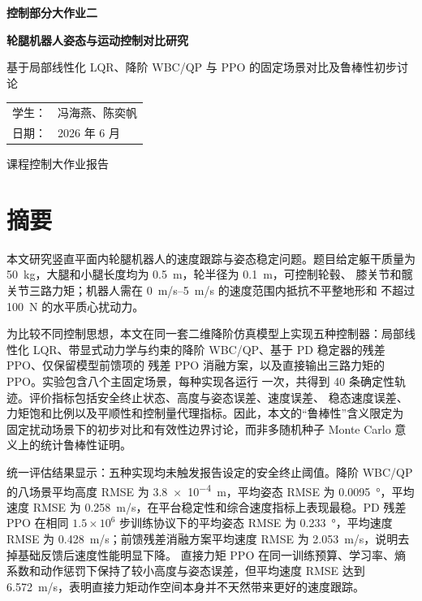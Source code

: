 \documentclass[UTF8,12pt,a4paper,fontset=none]{ctexart}
\begin{document}
\begin{titlepage}
  \centering
  \vspace*{2.0cm}
  {\bfseries 控制部分大作业二\par}
  \vspace{1.0cm}
  {\bfseries 轮腿机器人姿态与运动控制对比研究\par}
  \vspace{0.8cm}
  { 基于局部线性化 LQR、降阶 WBC/QP 与 PPO 的固定场景对比及鲁棒性初步讨论\par}
  \vfill
  \begin{tabular}{rl}
    学生：& 冯海燕、陈奕帆\\[0.4em]
    日期：& 2026 年 6 月
  \end{tabular}
  \vfill
  {\large 课程控制大作业报告\par}
\end{titlepage}


\section*{摘要}
本文研究竖直平面内轮腿机器人的速度跟踪与姿态稳定问题。题目给定躯干质量为
\SI{50}{kg}，大腿和小腿长度均为 \SI{0.5}{m}，轮半径为 \SI{0.1}{m}，可控制轮毂、
膝关节和髋关节三路力矩；机器人需在 \SI{0}{m/s}--\SI{5}{m/s} 的速度范围内抵抗不平整地形和
不超过 \SI{100}{N} 的水平质心扰动力。

为比较不同控制思想，本文在同一套二维降阶仿真模型上实现五种控制器：局部线性化
LQR、带显式动力学与约束的降阶 WBC/QP、基于 PD 稳定器的残差 PPO、仅保留模型前馈项的
残差 PPO 消融方案，以及直接输出三路力矩的 PPO。实验包含八个主固定场景，每种实现各运行
一次，共得到 40 条确定性轨迹。评价指标包括安全终止状态、高度与姿态误差、速度误差、
稳态速度误差、力矩饱和比例以及平顺性和控制量代理指标。因此，本文的“鲁棒性”含义限定为
固定扰动场景下的初步对比和有效性边界讨论，而非多随机种子 Monte Carlo 意义上的统计鲁棒性证明。

统一评估结果显示：五种实现均未触发报告设定的安全终止阈值。降阶 WBC/QP 的八场景平均高度 RMSE 为
\SI{3.8e-4}{m}，平均姿态 RMSE 为 \SI{0.0095}{\degree}，平均速度 RMSE 为
\SI{0.258}{m/s}，在平台稳定性和综合速度指标上表现最稳。PD 残差 PPO 在相同
$1.5\times10^6$ 步训练协议下的平均姿态 RMSE 为 \SI{0.233}{\degree}，平均速度 RMSE 为
\SI{0.428}{m/s}；前馈残差消融方案平均速度 RMSE 为 \SI{2.053}{m/s}，说明去掉基础反馈后速度性能明显下降。
直接力矩 PPO 在同一训练预算、学习率、熵系数和动作惩罚下保持了较小高度与姿态误差，但平均速度 RMSE 达到
\SI{6.572}{m/s}，表明直接力矩动作空间本身并不天然带来更好的速度跟踪。
\end{document}
